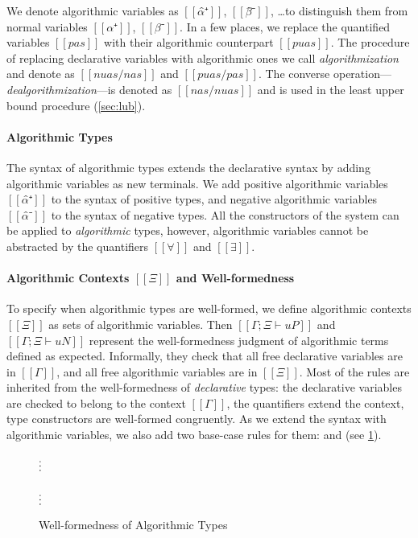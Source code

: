 We denote algorithmic variables as $[[α̂⁺]]$, $[[β̂⁻]]$, \dots to distinguish
them from normal variables $[[α⁺]]$, $[[β⁻]]$. In a few places, we replace the
quantified variables $[[pas]]$ with their algorithmic counterpart $[[puas]]$.
The procedure of replacing declarative variables with algorithmic ones we call
\emph{algorithmization} and denote as $[[ nuas/nas ]]$ and $[[ puas/pas ]]$. The
converse operation---\emph{dealgorithmization}---is denoted as $[[ nas/nuas ]]$ and 
is used in the least upper bound procedure (\cref{sec:lub}).

\paragraph*{Algorithmic Types}
The syntax of algorithmic types extends the declarative syntax by adding
algorithmic variables as new terminals. We add positive algorithmic variables $[[α̂⁺]]$ 
to the syntax of positive types, and negative algorithmic variables $[[α̂⁻]]$ to the 
syntax of negative types. All the constructors of the system can be applied 
to \emph{algorithmic} types, however, algorithmic variables cannot be abstracted by the
quantifiers $[[∀]]$ and $[[∃]]$.

\paragraph*{Algorithmic Contexts $[[Ξ]]$ and Well-formedness}
To specify when algorithmic types are well-formed, we define algorithmic
contexts $[[Ξ]]$ as sets of algorithmic variables. Then
$[[Γ ; Ξ ⊢ uP]]$ and $[[Γ ; Ξ ⊢ uN]]$ represent the well-formedness judgment of
algorithmic terms defined as expected. Informally, they check that all free
declarative variables are in $[[Γ]]$, and all free algorithmic variables are in
$[[Ξ]]$. Most of the rules are inherited from the well-formedness of
\emph{declarative} types: the declarative variables are checked to belong to the
context $[[Γ]]$, the quantifiers extend the context, type constructors are
well-formed congruently. As we extend the syntax with algorithmic variables, we
also add two base-case rules for them:  and
 (see \cref{fig:algo-wf}).

\begin{figure}
\begin{multicols}{2}
  $\vcenter{\hbox{\vdots}}$\\
  \ottusedrule{\ottdruleWFATPUVarLabeled{}}
  \columnbreak\\
  $\vcenter{\hbox{\vdots}}$\\
  \ottusedrule{\ottdruleWFATNUVarLabeled{}}
\end{multicols}
\caption{Well-formedness of Algorithmic Types}
\label{fig:algo-wf}
\end{figure}

